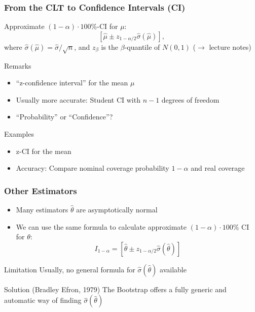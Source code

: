 \begin{frame}
	\frametitle{From the CLT to Confidence Intervals (CI)}
	Approximate $(1-\alpha)\cdot 100\%$-CI for $\mu$:
	$$
	  [\hat\mu \pm z_{1-\alpha/2} \hat\sigma(\hat\mu)],
	$$
	where $\hat\sigma(\hat\mu) = \hat\sigma / \sqrt{n}$, and $z_\beta$ is the $\beta$-quantile of $N(0,1)$ ($\rightarrow$ lecture notes)
	
	\vfill
	
	\begin{block}{Remarks}
		\begin{itemize}
		\item ``z-confidence interval'' for the mean $\mu$
		\item Usually more accurate: Student CI with $n-1$ degrees of freedom
		\item ``Probability'' or ``Confidence''?
		\end{itemize}
	\end{block}
	
	\begin{exampleblock}{Examples}
		\begin{itemize}
			\item z-CI for the mean
			\item Accuracy: Compare nominal coverage probability $1-\alpha$ and real coverage
		\end{itemize}
	\end{exampleblock}
\end{frame}

\begin{frame}
	\frametitle{Other Estimators}
	\begin{itemize}
		\item Many estimators $\hat \theta$ are asymptotically normal
		\item We can use the same formula to calculate approximate $(1-\alpha)\cdot 100\%$ CI for $\theta$:
			$$
		 		I_{1-\alpha} = [\hat \theta \pm z_{1-\alpha/2} \hat \sigma(\hat\theta)]
			$$
	\end{itemize}
	
	\vfill
	
	\begin{block}{Limitation}
		Usually, no general formula for $\hat \sigma(\hat\theta)$ available
	\end{block}
	
	\begin{block}{Solution (Bradley Efron, 1979)}
		\alert{The Bootstrap} offers a fully generic and automatic way of finding $\hat \sigma(\hat\theta)$
	\end{block}	
\end{frame}

